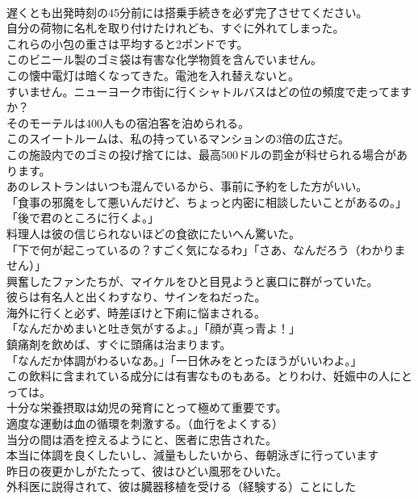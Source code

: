 \documentclass[8pt]{extreport}
\begin{document}
\begin{CJK}{UTF8}{min}
\\	遅くとも出発時刻の45分前には搭乗手続きを必ず完了させてください。
\\	自分の荷物に名札を取り付けたけれども、すぐに外れてしまった。
\\	これらの小包の重さは平均すると2ポンドです。
\\	このビニール製のゴミ袋は有害な化学物質を含んでいません。
\\	この懐中電灯は暗くなってきた。電池を入れ替えないと。
\\	すいません。ニューヨーク市街に行くシャトルバスはどの位の頻度で走ってますか？
\\	そのモーテルは400人もの宿泊客を泊められる。
\\	このスイートルームは、私の持っているマンションの3倍の広さだ。
\\	この施設内でのゴミの投げ捨てには、最高500ドルの罰金が科せられる場合があります。
\\	あのレストランはいつも混んでいるから、事前に予約をした方がいい。
\\	「食事の邪魔をして悪いんだけど、ちょっと内密に相談したいことがあるの。」「後で君のところに行くよ。」
\\	料理人は彼の信じられないほどの食欲にたいへん驚いた。
\\	「下で何が起こっているの？すごく気になるわ」「さあ、なんだろう（わかりません）」
\\	興奮したファンたちが、マイケルをひと目見ようと裏口に群がっていた。
\\	彼らは有名人と出くわすなり、サインをねだった。
\\	海外に行くと必ず、時差ぼけと下痢に悩まされる。
\\	「なんだかめまいと吐き気がするよ。」「顔が真っ青よ！」
\\	鎮痛剤を飲めば、すぐに頭痛は治まります。
\\	「なんだか体調がわるいなあ。」「一日休みをとったほうがいいわよ。」
\\	この飲料に含まれている成分には有害なものもある。とりわけ、妊娠中の人にとっては。
\\	十分な栄養摂取は幼児の発育にとって極めて重要です。
\\	適度な運動は血の循環を刺激する。（血行をよくする）
\\	当分の間は酒を控えるようにと、医者に忠告された。
\\	本当に体調を良くしたいし、減量もしたいから、毎朝泳ぎに行っています
\\	昨日の夜更かしがたたって、彼はひどい風邪をひいた。
\\	外科医に説得されて、彼は臓器移植を受ける（経験する）ことにした

\end{CJK}
\end{document}

